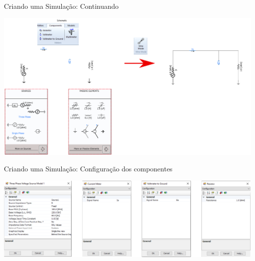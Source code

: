 \begin{frame}{Criando uma Simulação: Continuando}
\centering


\includegraphics[width=0.85\linewidth]{./figuras/Primeiros-Passos/circuito1}



\end{frame}





\begin{frame}{Criando uma Simulação: Configuração dos componentes}
\centering


\includegraphics[width=0.85\linewidth]{./figuras/Primeiros-Passos/circuito1_Config_componentes}



\end{frame}




